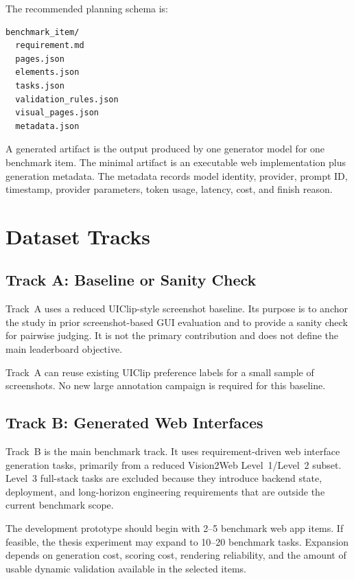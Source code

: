 The recommended planning schema is:

\begin{verbatim}
benchmark_item/
  requirement.md
  pages.json
  elements.json
  tasks.json
  validation_rules.json
  visual_pages.json
  metadata.json
\end{verbatim}

A generated artifact is the output produced by one generator model for one
benchmark item. The minimal artifact is an executable web implementation plus
generation metadata. The metadata records model identity, provider, prompt ID,
timestamp, provider parameters, token usage, latency, cost, and finish reason.

\section{Dataset Tracks}
\label{sec:tracks}

\subsection{Track A: Baseline or Sanity Check}
\label{sec:track-a}

Track~A uses a reduced UIClip-style screenshot baseline. Its purpose is to
anchor the study in prior screenshot-based GUI evaluation and to provide a
sanity check for pairwise judging. It is not the primary contribution and does
not define the main leaderboard objective.

Track~A can reuse existing UIClip preference labels for a small sample of
screenshots. No new large annotation campaign is required for this baseline.

\subsection{Track B: Generated Web Interfaces}
\label{sec:track-b}

Track~B is the main benchmark track. It uses requirement-driven web interface
generation tasks, primarily from a reduced Vision2Web Level~1/Level~2 subset.
Level~3 full-stack tasks are excluded because they introduce backend state,
deployment, and long-horizon engineering requirements that are outside the
current benchmark scope.

The development prototype should begin with 2--5 benchmark web app items. If
feasible, the thesis experiment may expand to 10--20 benchmark tasks. Expansion
depends on generation cost, scoring cost, rendering reliability, and the amount
of usable dynamic validation available in the selected items.

